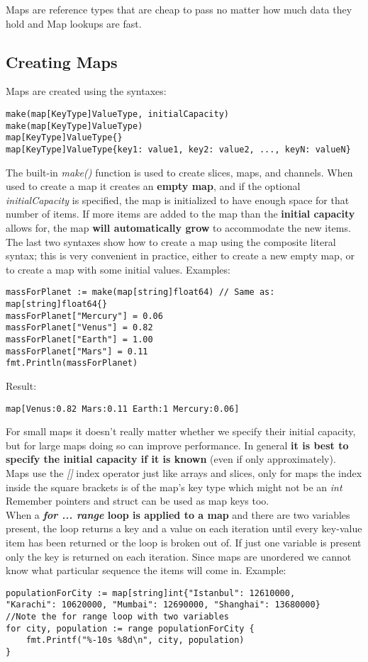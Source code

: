 \documentclass[10pt,letterpaper]{report}
\begin{document}
Maps are reference types that are cheap to pass no matter how much data they hold and Map lookups are fast.
\subsection{Creating Maps}
Maps are created using the syntaxes:
\begin{lstlisting}
make(map[KeyType]ValueType, initialCapacity)
make(map[KeyType]ValueType)
map[KeyType]ValueType{}
map[KeyType]ValueType{key1: value1, key2: value2, ..., keyN: valueN}
\end{lstlisting}
The built-in \textit{make()} function is used to create slices, maps, and channels. When used to create a map it creates an \textbf{empty map}, and if the optional \textit{initialCapacity} is specified, the map is initialized to have enough space for that number of items. If more items are added to the map than the \textbf{initial capacity} allows for, the map \textbf{will automatically grow} to accommodate the new items.\\
The last two syntaxes show how to create a map using the composite literal syntax; this is very convenient in practice, either to create a new empty map, or to create a map with some initial values. Examples:
\begin{lstlisting}
massForPlanet := make(map[string]float64) // Same as: map[string]float64{}
massForPlanet["Mercury"] = 0.06
massForPlanet["Venus"] = 0.82
massForPlanet["Earth"] = 1.00
massForPlanet["Mars"] = 0.11
fmt.Println(massForPlanet)
\end{lstlisting}
Result:
\begin{lstlisting}
map[Venus:0.82 Mars:0.11 Earth:1 Mercury:0.06]
\end{lstlisting}
For small maps it doesn't really matter whether we specify their initial capacity, but for large maps doing so can improve performance. In general \textbf{it is best to specify the initial capacity if it is known} (even if only approximately).\\
Maps use the \textit{[]} index operator just like arrays and slices, only for maps the index inside the square brackets is of the map's key type which might not be an \textit{int}\\
Remember pointers and struct can be used as map keys too.\\
When a \textbf{\textit{for ... range} loop is applied to a map} and there are two variables present, the loop returns a key and a value on each iteration until every key-value item has been returned or the loop is broken out of. If just one variable is present only the key is returned on each iteration. Since maps are unordered we cannot know what particular sequence the items will come in. Example:
\begin{lstlisting}
populationForCity := map[string]int{"Istanbul": 12610000,
"Karachi": 10620000, "Mumbai": 12690000, "Shanghai": 13680000}
//Note the for range loop with two variables
for city, population := range populationForCity {
	fmt.Printf("%-10s %8d\n", city, population)
}
\end{lstlisting}
\end{document}
